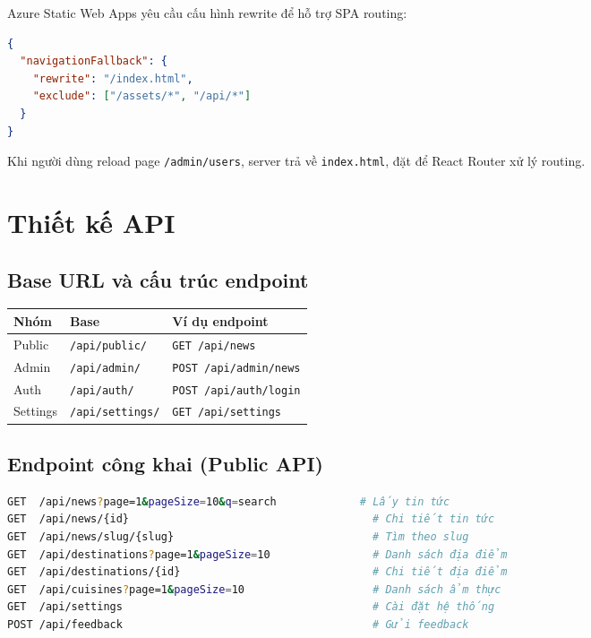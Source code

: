 \documentclass[12pt,a4paper,oneside]{report}
\begin{document}
Azure Static Web Apps yêu cầu cấu hình rewrite để hỗ trợ SPA routing:

\begin{lstlisting}[language=json,caption={Cấu hình SPA rewrite trong staticwebapp.config.json}]
{
  "navigationFallback": {
    "rewrite": "/index.html",
    "exclude": ["/assets/*", "/api/*"]
  }
}
\end{lstlisting}

Khi người dùng reload page \texttt{/admin/users}, server trả về \texttt{index.html}, đặt để React Router xử lý routing.

\section{Thiết kế API}

\subsection{Base URL và cấu trúc endpoint}

\begin{center}
\begin{tabular}{|l|l|l|}
\hline
\textbf{Nhóm} & \textbf{Base} & \textbf{Ví dụ endpoint} \\
\hline
Public & \texttt{/api/public/} & \texttt{GET /api/news} \\
\hline
Admin & \texttt{/api/admin/} & \texttt{POST /api/admin/news} \\
\hline
Auth & \texttt{/api/auth/} & \texttt{POST /api/auth/login} \\
\hline
Settings & \texttt{/api/settings/} & \texttt{GET /api/settings} \\
\hline
\end{tabular}
\end{center}

\subsection{Endpoint công khai (Public API)}

\begin{lstlisting}[language=bash,caption={Danh sách endpoint public}]
GET  /api/news?page=1&pageSize=10&q=search             # Lấy tin tức
GET  /api/news/{id}                                      # Chi tiết tin tức
GET  /api/news/slug/{slug}                               # Tìm theo slug
GET  /api/destinations?page=1&pageSize=10                # Danh sách địa điểm
GET  /api/destinations/{id}                              # Chi tiết địa điểm
GET  /api/cuisines?page=1&pageSize=10                    # Danh sách ẩm thực
GET  /api/settings                                       # Cài đặt hệ thống
POST /api/feedback                                       # Gửi feedback
\end{lstlisting}
\end{document}

